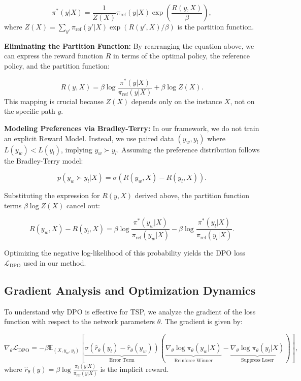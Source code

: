 \documentclass{article}
\theoremstyle{plain}
\theoremstyle{definition}
\theoremstyle{remark}
\begin{document}
\begin{equation}
    \pi^*(y|X) = \frac{1}{Z(X)} \pi_{\text{ref}}(y|X) \exp\left( \frac{R(y, X)}{\beta} \right),
\end{equation}
where $Z(X) = \sum_{y'} \pi_{\text{ref}}(y'|X) \exp(R(y', X)/\beta)$ is the partition function.

\textbf{Eliminating the Partition Function:} By rearranging the equation above, we can express the reward function $R$ in terms of the optimal policy, the reference policy, and the partition function:

\begin{equation}
    R(y, X) = \beta \log \frac{\pi^*(y|X)}{\pi_{\text{ref}}(y|X)} + \beta \log Z(X).
\end{equation}
This mapping is crucial because $Z(X)$ depends only on the instance $X$, not on the specific path $y$.

\textbf{Modeling Preferences via Bradley-Terry:} In our framework, we do not train an explicit Reward Model. Instead, we use paired data $(y_w, y_l)$ where $L(y_w) < L(y_l)$, implying $y_w \succ y_l$. Assuming the preference distribution follows the Bradley-Terry model:

\begin{equation}
    p(y_w \succ y_l | X) = \sigma(R(y_w, X) - R(y_l, X)).
\end{equation}

Substituting the expression for $R(y, X)$ derived above, the partition function terms $\beta \log Z(X)$ cancel out:

\begin{equation}
    R(y_w, X) - R(y_l, X) = \beta \log \frac{\pi^*(y_w|X)}{\pi_{\text{ref}}(y_w|X)} - \beta \log \frac{\pi^*(y_l|X)}{\pi_{\text{ref}}(y_l|X)}.
\end{equation}

Optimizing the negative log-likelihood of this probability yields the DPO loss $\mathcal{L}_{\text{DPO}}$ used in our method.

\subsection{Gradient Analysis and Optimization Dynamics}
To understand why DPO is effective for TSP, we analyze the gradient of the loss function with respect to the network parameters $\theta$. The gradient is given by:

\begin{equation}
    \nabla_\theta \mathcal{L}_{\text{DPO}} = - \beta \mathbb{E}_{(X, y_w, y_l)} \left[ \underbrace{\sigma(\hat{r}_\theta(y_l) - \hat{r}_\theta(y_w))}_{\text{Error Term}} \left( \underbrace{\nabla_\theta \log \pi_\theta(y_w|X)}_{\text{Reinforce Winner}} - \underbrace{\nabla_\theta \log \pi_\theta(y_l|X)}_{\text{Suppress Loser}} \right) \right],
\end{equation}
where $\hat{r}_\theta(y) = \beta \log \frac{\pi_\theta(y|X)}{\pi_{\text{ref}}(y|X)}$ is the implicit reward.
\end{document}
